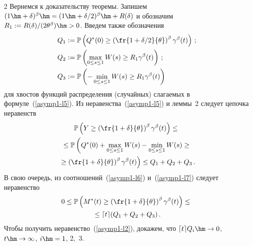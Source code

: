 \begin{multicols}{2}
Вернемся к доказательству теоремы. Запишем
$(1\hm+\delta)^\beta\hm=(1\hm+\delta/2)^\beta\hm+R(\delta)$ и обозначим
$R_1:=R(\delta)/(2{\theta}^\beta)\hm>0$. Введем также  обозначения
\begin{align*}
Q_1&:=\mathbb{P} \left(Q^*(0) \geq \left(\fr{1+\delta/2}{\theta}\right)^\beta \gamma^\beta(t)\right)\,;
\\
Q_2&:=\mathbb{P} \left(\max_{0 \leq s \leq 1}W(s) \geq R_1 \gamma^\beta(t) \right)\,;
\\
Q_3&:=\mathbb{P} \left(-\min_{0 \leq s \leq 1}W(s) \geq R_1 \gamma^\beta(t) \right)
\end{align*}
для хвостов функций распределения (случайных) слагаемых в формуле~(\ref{asymp1-l5}).
 Из неравенства~(\ref{asymp1-l5}) и леммы~2 следует цепочка неравенств
\begin{multline}
\mathbb{P} \left( Y \geq \left( \fr{1+\delta}{\theta}
\right)^\beta\gamma^\beta(t)\right)\leq{}\\
{}\leq \mathbb{P} \left( Q^*(0)+\max\limits_{0 \leq s \leq 1}W(s)-\min\limits_{0 \leq s
\leq 1}W(s)  \geq{}\right.\\
\left.{}\geq \left( \fr{1+\delta}{\theta}
\right)^\beta\gamma^\beta(t)\right)
\leq Q_1+Q_2+Q_3\,.\label{asymp1-l7}
\end{multline}
В свою очередь, из соотношений~(\ref{asymp1-l6}) и~(\ref{asymp1-l7})
следует неравенство
\begin{multline*}
0 \leq \mathbb{P}\left(M^*(t) \geq \left( \fr{1+\delta}{\theta}
\right)^\beta \gamma^\beta(t)  \right) \leq{}\\
{}\leq \lceil t \rceil
(Q_1+Q_2+Q_3)\,.
\end{multline*}
Чтобы получить неравенство~(\ref{asymp1-l2}), докажем, что
 $\lceil t \rceil Q_i \hm\to 0$, $t \hm\to \infty$,
$i\hm=1$, 2,~3.

\pagebreak


\end{multicols}
